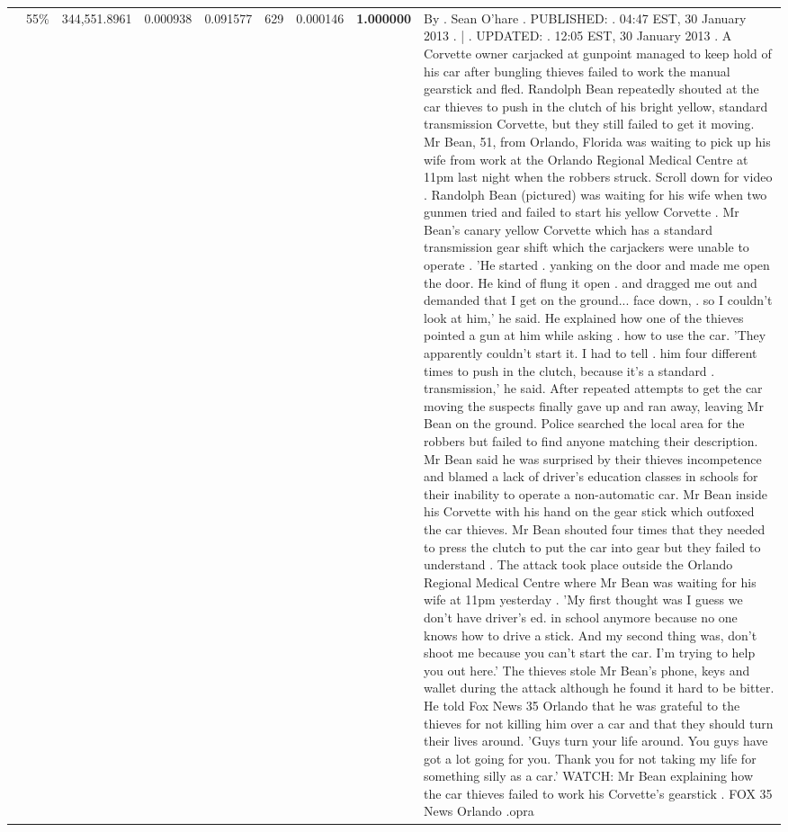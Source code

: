 \begin{table}[H]
\begin{tabular}{llrrrrrrl}
 & 55\% & 344,551.8961 & 0.000938 & 0.091577 & \color{red} 629 & 0.000146 & \bfseries \color{red} 1.000000 & By . Sean O'hare . PUBLISHED: . 04:47 EST, 30 January 2013 . | . UPDATED: . 12:05 EST, 30 January 2013 . A Corvette owner carjacked at gunpoint managed to keep hold of his car after bungling thieves failed to work the manual gearstick and fled. Randolph Bean repeatedly shouted at the car thieves to push in the clutch of his bright yellow, standard transmission Corvette, but they still failed to get it moving. Mr Bean, 51, from Orlando, Florida was waiting to pick up his wife from work at the Orlando Regional Medical Centre at 11pm last night when the robbers struck. Scroll down for video . Randolph Bean (pictured) was waiting for his wife when two gunmen tried and failed to start his yellow Corvette . Mr Bean's canary yellow Corvette which has a standard transmission gear shift which the carjackers were unable to operate . 'He started . yanking on the door and made me open the door. He kind of flung it open . and dragged me out and demanded that I get on the ground... face down, . so I couldn't look at him,' he said. He explained how one of the thieves pointed a gun at him while asking . how to use the car. 'They apparently couldn't start it. I had to tell . him four different times to push in the clutch, because it's a standard . transmission,' he said. After repeated attempts to get the car moving the suspects finally gave up and ran away, leaving Mr Bean on the ground. Police searched the local area for the robbers but failed to find anyone matching their description. Mr Bean said he was surprised by their thieves incompetence and blamed a lack of driver's education classes in schools for their inability to operate a non-automatic car. Mr Bean inside his Corvette with his hand on the gear stick which outfoxed the car thieves. Mr Bean shouted four times that they needed to press the clutch to put the car into gear but they failed to understand . The attack took place outside the Orlando Regional Medical Centre where Mr Bean was waiting for his wife at 11pm yesterday . 'My first thought was I guess we don't have driver's ed. in school anymore because no one knows how to drive a stick. And my second thing was, don't shoot me because you can't start the car. I'm trying to help you out here.' The thieves stole Mr Bean's phone, keys and wallet during the attack although he found it hard to be bitter. He told Fox News 35 Orlando that he was grateful to the thieves for not killing him over a car and that they should turn their lives around. 'Guys turn your life around. You guys have got a lot going for you. Thank you for not taking my life for something silly as a car.' WATCH: Mr Bean explaining how the car thieves failed to work his Corvette's gearstick . FOX 35 News Orlando .opra \\

\end{tabular}
\end{table}
